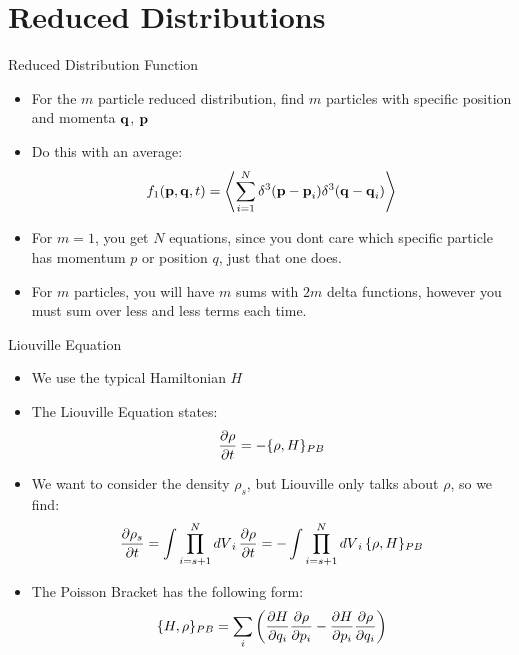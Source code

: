 \documentclass{beamer}
\begin{document}
\section{Reduced Distributions}
\begin{frame}{Reduced Distribution Function}
  \begin{itemize}
  \item For the $m$ particle reduced distribution, find $m$ particles with specific position and momenta $\vb{q}$, $\vb{p}$
  \item Do this with an average:
    \begin{align*}
      f_1(\vb{p},\vb{q},t)=
      \ev{\sum_{i=1}^N\delta^3(\vb{p-p}_i)\delta^3(\vb{q-q}_i)}
    \end{align*}
  \item For $m=1$, you get $N$ equations, since you dont care which specific particle has momentum $p$ or position $q$, just that one does. 
  \item For $m$ particles, you will have $m$ sums with $2m$ delta functions, however you must sum over less and less terms each time. 
  \end{itemize}
\end{frame}
\begin{frame}{Liouville Equation}
  \begin{itemize}
  \item We use the typical Hamiltonian $H$
  \item The Liouville Equation states:
    \begin{align*}
      \pdv{\rho}{t}=-\{\rho,H\}_{PB}
    \end{align*}
  \item We want to consider the density $\rho_s$, but Liouville only talks about $\rho$, so we find:
    \begin{align*}
      \pdv{\rho_s}{t}=\int\prod_{i=s+1}^N\dd{V}_i\pdv{\rho}{t}=
      -\int\prod_{i=s+1}^N\dd{V}_i\{\rho,H\}_{PB}
    \end{align*}
  \item The Poisson Bracket has the following form:
    \begin{align*}
      \{H,\rho\}_{PB}=\sum_i\qty(
      \pdv{H}{q_i}\pdv{\rho}{p_i}-\pdv{H}{p_i}\pdv{\rho}{q_i}
      )
    \end{align*}
  \end{itemize}
\end{frame}
\end{document}
